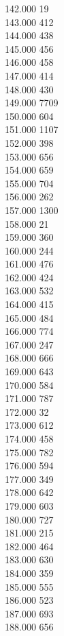 { 142.000	19 \\
 143.000	412 \\
 144.000	438 \\
 145.000	456 \\
 146.000	458 \\
 147.000	414 \\
 148.000	430 \\
 149.000	7709 \\
 150.000	604 \\
 151.000	1107 \\
 152.000	398 \\
 153.000	656 \\
 154.000	659 \\
 155.000	704 \\
 156.000	262 \\
 157.000	1300 \\
 158.000	21 \\
 159.000	360 \\
 160.000	244 \\
 161.000	476 \\
 162.000	424 \\
 163.000	532 \\
 164.000	415 \\
 165.000	484 \\
 166.000	774 \\
 167.000	247 \\
 168.000	666 \\
 169.000	643 \\
 170.000	584 \\
 171.000	787 \\
 172.000	32 \\
 173.000	612 \\
 174.000	458 \\
 175.000	782 \\
 176.000	594 \\
 177.000	349 \\
 178.000	642 \\
 179.000	603 \\
 180.000	727 \\
 181.000	215 \\
 182.000	464 \\
 183.000	630 \\
 184.000	359 \\
 185.000	555 \\
 186.000	523 \\
 187.000	693 \\
 188.000	656 \\
}
